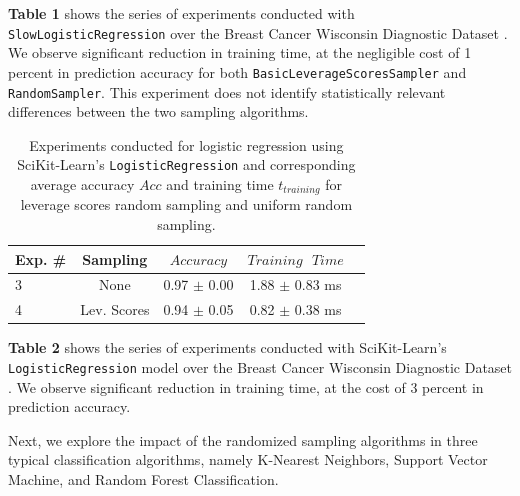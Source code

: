 \documentclass{article}
\theoremstyle{plain}
\theoremstyle{definition}
\theoremstyle{remark}
\begin{document}
\textbf{Table 1} shows the series of experiments conducted with \texttt{SlowLogisticRegression} over the Breast Cancer Wisconsin Diagnostic Dataset \cite{breastcancer}. We observe significant reduction in training time, at the negligible cost of 1 percent in prediction accuracy for both \texttt{BasicLeverageScoresSampler} and \texttt{RandomSampler}. This experiment does not identify statistically relevant differences between the two sampling algorithms.

\begin{table}[t]
	\caption{Experiments conducted for logistic regression using SciKit-Learn's \texttt{LogisticRegression} and corresponding average accuracy $Acc$ and training time $t_{training}$ for leverage scores random sampling and uniform random sampling.}
	\label{t2}
	\vskip 0.15in
	\begin{center}
		\begin{small}
			\begin{sc}
				\begin{tabular}{lcccr}
					\toprule
					Exp. \# & Sampling & $Accuracy$ & $Training \text{ } Time$\\
					\midrule
					3 & None & 0.97 $\pm$ 0.00 & 1.88 $\pm$ 0.83 ms \\
					4 & Lev. Scores & 0.94 $\pm$ 0.05 & 0.82 $\pm$ 0.38 ms \\
					\bottomrule
				\end{tabular}
			\end{sc}
		\end{small}
	\end{center}
	\vskip -0.1in
\end{table}

\textbf{Table 2} shows the series of experiments conducted with SciKit-Learn's \texttt{LogisticRegression} model over the Breast Cancer Wisconsin Diagnostic Dataset \cite{breastcancer}. We observe significant reduction in training time, at the cost of 3 percent in prediction accuracy.

Next, we explore the impact of the randomized sampling algorithms in three typical classification algorithms, namely K-Nearest Neighbors, Support Vector Machine, and Random Forest Classification.
\end{document}
